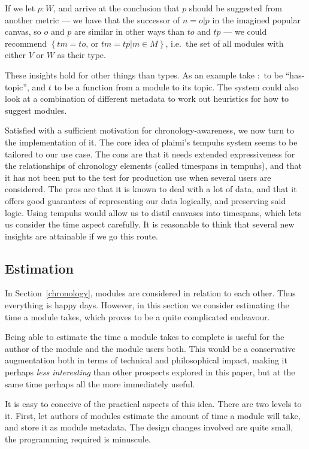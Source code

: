 \documentclass{article}
\begin{document}
\begin{multicols}{2}
If we let $p : W$, and arrive at the conclusion that $p$ should be suggested 
from another metric --- we have that the successor of $n = o \vert p$ in the 
imagined popular canvas, so $o$ and $p$ are similar in other ways than $t o$ 
and $t p$ --- we could recommend $\left\{ t m = t o\text{, or }t m = t p \vert 
m \in M \right\}$, i.e.\ the set of all modules with either $V$ or $W$ as 
their type.

These insights hold for other things than types. As an example take $:$ to be 
``has-topic'', and $t$ to be a function from a module to its topic. The system 
could also look at a combination of different metadata to work out heuristics 
for how to suggest modules.

Satisfied with a sufficient motivation for chronology-awareness, we now turn 
to the implementation of it. The core idea of plaimi's tempuhs system seems to 
be tailored to our use case. The cons are that it needs extended 
expressiveness for the relationships of chronology elements (called timespans 
in tempuhs), and that it has not been put to the test for production use when 
several users are considered. The pros are that it is known to deal with a lot 
of data, and that it offers good guarantees of representing our data 
logically, and preserving said logic. Using tempuhs would allow us to distil 
canvases into timespans, which lets us consider the time aspect carefully. It 
is reasonable to think that several new insights are attainable if we go this 
route.
 \subsection{Estimation}
\label{estimation}
In Section~\ref{chronology}, modules are considered in relation to each other. 
Thus everything is happy days. However, in this section we consider estimating 
the time a module takes, which proves to be a quite complicated endeavour.

Being able to estimate the time a module takes to complete is useful for the 
author of the module and the module users both. This would be a conservative 
augmentation both in terms of technical and philosophical impact, making it 
perhaps \emph{less interesting} than other prospects explored in this paper, 
but at the same time perhaps all the more immediately useful.

It is easy to conceive of the practical aspects of this idea. There are two 
levels to it. First, let authors of modules estimate the amount of time a 
module will take, and store it as module metadata. The design changes involved 
are quite small, the programming required is minuscule.


\end{multicols}
\end{document}
